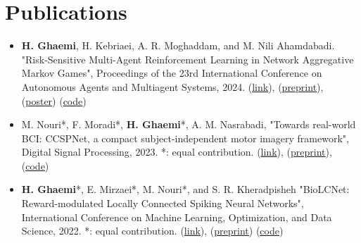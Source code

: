 \documentclass[A4,11pt]{article}
\makeatletter
\newcommand{\CVItem}[1]{
  \item\small{
    {#1 \vspace{-2pt}}
  }
}
\newcommand{\CVSubheading}[4]{
  \vspace{-2pt}\item
    \begin{tabular*}{0.97\textwidth}[t]{l@{\extracolsep{\fill}}r}
      \textbf{#1} & #2 \\
      \small#3 & \small #4 \\
    \end{tabular*}\vspace{-7pt}
}
\newcommand{\CVItemListStart}{\begin{itemize}}
\newcommand{\CVItemListEnd}{\end{itemize}\vspace{-5pt}}
\makeatother
\begin{document}

\section{Publications}
\CVItemListStart
\CVItem{\textbf{H. Ghaemi}, H. Kebriaei, A. R. Moghaddam, and M. Nili Ahamdabadi. "Risk-Sensitive Multi-Agent Reinforcement Learning in Network Aggregative Markov Games", Proceedings of the 23rd International Conference on Autonomous Agents and Multiagent Systems, 2024. (\href{https://dl.acm.org/doi/10.5555/3635637.3663134}{\underline{link}}), (\href{https://arxiv.org/abs/2402.05906}{\underline{preprint}}), (\href{https://github.com/hafezgh/risk-sensitive-marl-namg/blob/main/Poster_RSMARL_AAMAS2024.pdf}{\underline{poster}}) (\href{https://github.com/hafezgh/risk-sensitive-marl-namg/}{\underline{code}})}

\CVItem{M. Nouri*, F. Moradi*, \textbf{H. Ghaemi}*, A. M. Nasrabadi, "Towards real-world BCI: CCSPNet, a compact subject-independent motor imagery framework", Digital Signal Processing, 2023. *: equal contribution. (\href{https://doi.org/10.1016/j.dsp.2022.103816}{\underline{link}}), (\href{https://arxiv.org/abs/2012.13567}{\underline{preprint}}), (\href{https://github.com/Singular-Brain/CCSPNet}{\underline{code}})}

\CVItem{\textbf{H. Ghaemi}*, E. Mirzaei*, M. Nouri*, and S. R. Kheradpisheh "BioLCNet: Reward-modulated Locally Connected Spiking Neural Networks", International Conference on Machine Learning, Optimization, and Data Science, 2022. *: equal contribution. (\href{https://doi.org/10.1007/978-3-031-25891-6_42}{\underline{link}}), (\href{https://arxiv.org/abs/2109.05539}{\underline{preprint}}) (\href{https://github.com/Singular-Brain/BioLCNet}{\underline{code}})}


\CVItemListEnd


\end{document}
